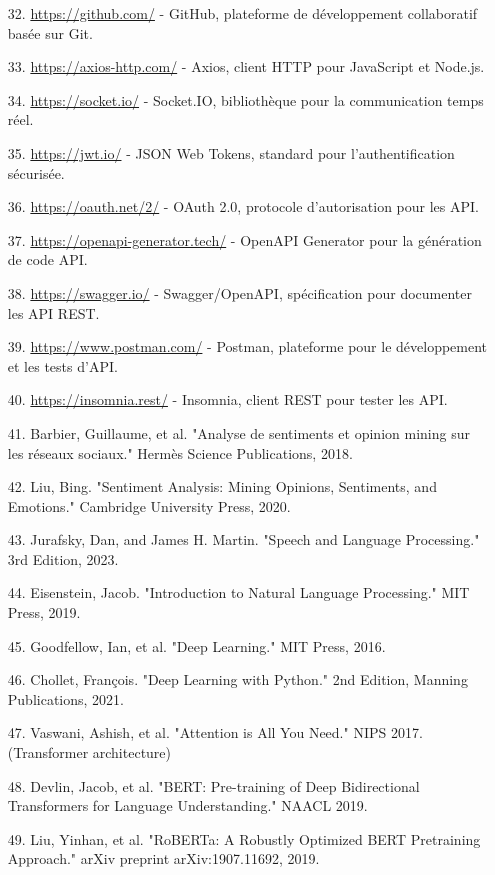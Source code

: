 \begin{itemize}[leftmargin=1cm, itemsep=0.3em, parsep=0.2em]
    \item[32.] \url{https://github.com/} - GitHub, plateforme de développement collaboratif basée sur Git.
    \item[33.] \url{https://axios-http.com/} - Axios, client HTTP pour JavaScript et Node.js.
    \item[34.] \url{https://socket.io/} - Socket.IO, bibliothèque pour la communication temps réel.
    \item[35.] \url{https://jwt.io/} - JSON Web Tokens, standard pour l'authentification sécurisée.
    \item[36.] \url{https://oauth.net/2/} - OAuth 2.0, protocole d'autorisation pour les API.
    \item[37.] \url{https://openapi-generator.tech/} - OpenAPI Generator pour la génération de code API.
    \item[38.] \url{https://swagger.io/} - Swagger/OpenAPI, spécification pour documenter les API REST.
    \item[39.] \url{https://www.postman.com/} - Postman, plateforme pour le développement et les tests d'API.
    \item[40.] \url{https://insomnia.rest/} - Insomnia, client REST pour tester les API.
    \item[41.] Barbier, Guillaume, et al. "Analyse de sentiments et opinion mining sur les réseaux sociaux." Hermès Science Publications, 2018.
    \item[42.] Liu, Bing. "Sentiment Analysis: Mining Opinions, Sentiments, and Emotions." Cambridge University Press, 2020.
    \item[43.] Jurafsky, Dan, and James H. Martin. "Speech and Language Processing." 3rd Edition, 2023.
    \item[44.] Eisenstein, Jacob. "Introduction to Natural Language Processing." MIT Press, 2019.
    \item[45.] Goodfellow, Ian, et al. "Deep Learning." MIT Press, 2016.
    \item[46.] Chollet, François. "Deep Learning with Python." 2nd Edition, Manning Publications, 2021.
    \item[47.] Vaswani, Ashish, et al. "Attention is All You Need." NIPS 2017. (Transformer architecture)
    \item[48.] Devlin, Jacob, et al. "BERT: Pre-training of Deep Bidirectional Transformers for Language Understanding." NAACL 2019.
    \item[49.] Liu, Yinhan, et al. "RoBERTa: A Robustly Optimized BERT Pretraining Approach." arXiv preprint arXiv:1907.11692, 2019.

\end{itemize}
